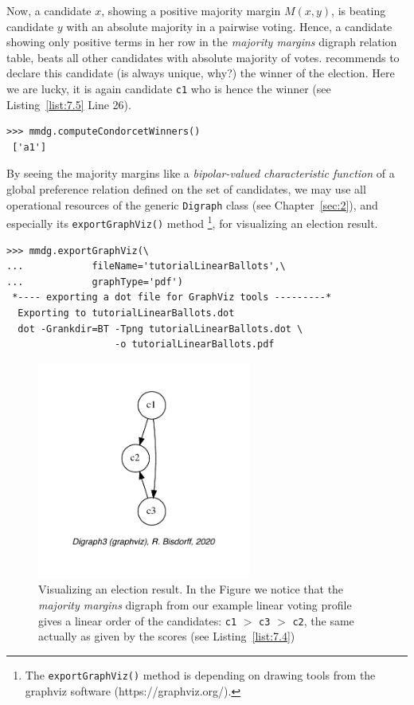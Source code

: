 Now, a candidate $x$, showing a positive majority margin $M(x,y)$, is beating candidate $y$  with an absolute majority in a pairwise voting. Hence, a candidate showing only positive terms in her row in the \emph{majority margins} digraph relation table, beats all other candidates with absolute majority of votes. \Condorcet recommends to declare this candidate (is always unique, why?) the winner of the election. Here we are lucky, it is again candidate \texttt{c1} who is hence the \Condorcet winner (see Listing~\vref{list:7.5} Line 26).
\begin{lstlisting}
>>> mmdg.computeCondorcetWinners()
 ['a1']  
\end{lstlisting}    

By seeing the majority margins like a \emph{bipolar-valued characteristic function} of a global preference relation defined on the set of candidates, we may use all operational resources of the generic \texttt{Digraph} class (see Chapter~\vref{sec:2}), and especially its \texttt{exportGraphViz()} method \footnote{The \texttt{exportGraphViz()} method is depending on drawing tools from the graphviz software (https://graphviz.org/).}, for visualizing an election result.
\begin{lstlisting}
>>> mmdg.exportGraphViz(\
...            fileName='tutorialLinearBallots',\
...            graphType='pdf')
 *---- exporting a dot file for GraphViz tools ---------*
  Exporting to tutorialLinearBallots.dot
  dot -Grankdir=BT -Tpng tutorialLinearBallots.dot \
                   -o tutorialLinearBallots.pdf
\end{lstlisting}
\begin{figure}[h]
\sidecaption[t]
\includegraphics[width=7cm]{Figures/7-1-tutorialBallots.pdf}
\caption{Visualizing an election result. In the Figure we notice that the \emph{majority margins} digraph from our example linear voting profile gives a linear order of the candidates: \texttt{c1} $>$ \texttt{c3} $>$ \texttt{c2}, the same actually as given by the \Borda scores (see Listing~\vref{list:7.4})
}
\label{fig:7.1}       %
\end{figure}

